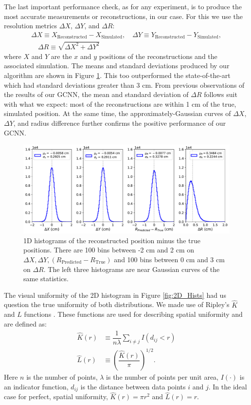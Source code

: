 \documentclass[../thesis.tex]{subfiles}
\begin{document}
\par The last important performance check, as for any experiment, is to produce the most accurate measurements or reconstructions, in our case.
For this we use the resolution metrics $\Delta X$, $\Delta Y$, and $\Delta R$:
\begin{gather*}
	\Delta X \equiv X_\text{Reconstructed} - X_\text{Simulated},
	\quad \Delta Y \equiv Y_\text{Reconstructed} - Y_\text{Simulated}, \\
	\quad \Delta R \equiv \sqrt{ \Delta X^2 + \Delta Y^2 }
\end{gather*}
where $X$ and $Y$ are the $x$ and $y$ positions of the reconstructions and the associated simulation.
The means and standard deviations produced by our algorithm are shown in Figure \ref{fig:1D_Hist}.
This too outperformed the state-of-the-art which had standard deviations greater than 3 cm.
From previous observations of the results of our GCNN, the mean and standard deviation of $\Delta R$ follows suit with what we expect: most of the reconstructions are within 1 cm of the true, simulated position.
At the same time, the approximately-Gaussian curves of $\Delta X$, $\Delta Y$, and radius difference further confirms the positive performance of our GCNN.
\begin{figure}[t]
	\centering
	\includegraphics[width=0.9\linewidth]{figures/1D_hist_Delaunay-Prenoise.pdf}
	\caption{
	1D histograms of the reconstructed position minus the true positions.
	There are 100 bins between -2 cm and 2 cm on $\Delta X, \Delta Y, (R_\text{Predicted} - R_\text{True})$ and 100 bins between 0 cm and 3 cm on $\Delta R$.
	The left three histograms are near Gaussian curves of the same statistics.
	}
	\label{fig:1D_Hist}
\end{figure}

\par The visual uniformity of the 2D histogram in Figure \ref{fig:2D_Hists} had us question the true uniformity of both distributions.
We made use of Ripley's $\widehat{K}$ and $\widehat{L}$ functions \cite{Ripley}.
These functions are used for describing spatial uniformity and are defined as:
\begin{align*}
	\widehat{K}(r) &\equiv \dfrac{1}{n\lambda} \sum_{i \neq j} I(d_{ij} < r) \\
	\widehat{L}(r) &\equiv \left( \dfrac{\widehat{K}(r)}{\pi} \right)^{1/2} .
\end{align*}
Here $n$ is the number of points, $\lambda$ is the number of points per unit area, $I(\cdot)$ is an indicator function, $d_{ij}$ is the distance between data points $i$ and $j$.
In the ideal case for perfect, spatial uniformity, $\widehat{K}(r) = \pi r^2$ and $\widehat{L}(r) = r$.
\end{document}
